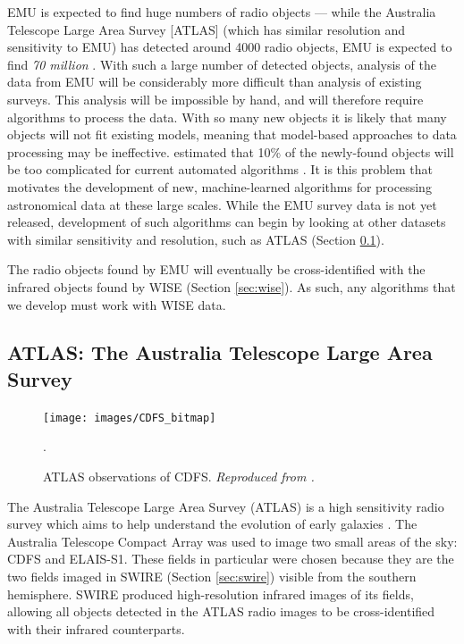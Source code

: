             EMU is expected to find huge numbers of radio objects --- while the
            Australia Telescope Large Area Survey [ATLAS] (which has similar
            resolution and sensitivity to EMU) has detected around 4000 radio
            objects, EMU is expected to find \emph{70 million}
            \citep{banfield15}. With such a large number of detected objects,
            analysis of the data from EMU will be considerably more difficult
            than analysis of existing surveys. This analysis will be impossible
            by hand, and will therefore require algorithms to process the data.
            With so many new objects it is likely that many objects will not fit
            existing models, meaning that model-based approaches to data
            processing may be ineffective. \citet{norris11} estimated that 10\%
            of the newly-found objects will be too complicated for current
            automated algorithms \citep{banfield15}. It is this problem that
            motivates the development of new, machine-learned algorithms for
            processing astronomical data at these large scales. While the EMU
            survey data is not yet released, development of such algorithms can
            begin by looking at other datasets with similar sensitivity and
            resolution, such as ATLAS (Section \ref{sec:atlas}).

            The radio objects found by EMU will eventually be cross-identified
            with the infrared objects found by WISE (Section \ref{sec:wise}). As
            such, any algorithms that we develop must work with WISE data.

        \subsection{ATLAS: The Australia Telescope Large Area Survey}
        \label{sec:atlas}

            \begin{figure}
                \centering
                \texttt{[image: images/CDFS\_bitmap]}
                \caption{ATLAS observations of CDFS.
                    \emph{Reproduced from \citet{franzen15}.}}.
                \label{fig:cdfs}
            \end{figure}

            The Australia Telescope Large Area Survey (ATLAS) is a high
            sensitivity radio survey which aims to help understand the evolution
            of early galaxies \citep{norris06}. The Australia Telescope Compact
            Array was used to image two small areas of the sky: CDFS and
            ELAIS-S1. These fields in particular were chosen because they are
            the two fields imaged in SWIRE (Section \ref{sec:swire}) visible from
            the southern hemisphere. SWIRE produced high-resolution infrared
            images of its fields, allowing all objects detected in the ATLAS
            radio images to be cross-identified with their infrared
            counterparts.

